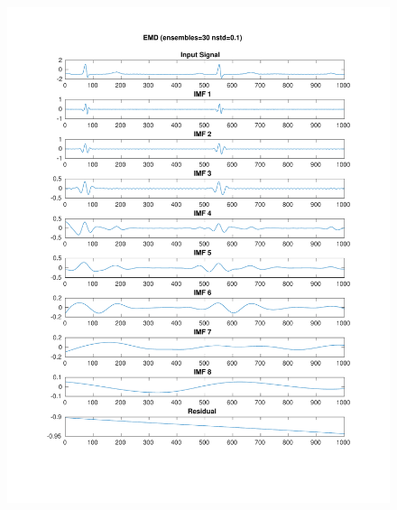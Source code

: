 \documentclass[11pt,a4paper]{article}
\begin{document}
\begin{figure}[H]
\centering
\begin{minipage}{0.48\textwidth}
	\centering
	\includegraphics[width=\textwidth]{fig/123l1_emd_ensemble.pdf}
	

\end{minipage}
\end{figure}
\end{document}
